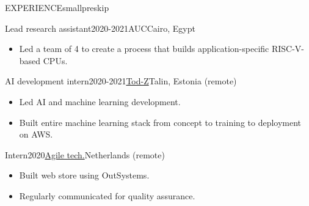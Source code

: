 \documentclass{resume}
\begin{document}
\begin{minipage}[t]{0.45\textwidth}
\begin{rsection}{\MakeUppercase{experience}}{smallpreskip}
\begin{rcontent}{Lead research assistant}{2020-2021}{AUC}{Cairo, Egypt}
			\begin{itemize}
				\item Led a team of 4 to create a process that builds application-specific RISC-V-based CPUs.
			\end{itemize}
		\end{rcontent}
		\divider
		\begin{rcontent}{AI development intern}{2020-2021}{\href{https://www.tod-z.com/}{Tod-Z}}{Talin, Estonia (remote)}
			\begin{itemize}
				\item Led AI and machine learning development.
				\item Built entire machine learning stack from concept to training to deployment on AWS.
			\end{itemize}
		\end{rcontent}
		\divider
		\begin{rcontent}{Intern}{2020}{\href{https://www.agiletz.com/}{Agile tech.}}{Netherlands (remote)}
			\begin{itemize}
				\item Built web store using OutSystems.
				\item Regularly communicated for quality assurance.
			\end{itemize}
		\end{rcontent}

	\end{rsection}


\end{minipage}
\end{document}
